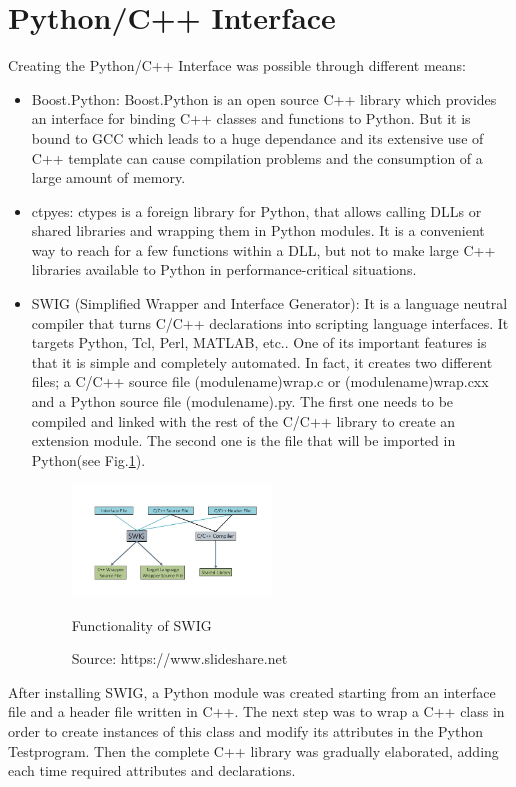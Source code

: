 \section{Python/C++ Interface}
Creating the Python/C++ Interface was possible through different means:\\
\begin{itemize}
\item Boost.Python: Boost.Python is an open source C++ library which provides an interface for binding C++ classes and functions to Python. But it is bound to GCC which leads to a huge dependance and its extensive use of C++ template can cause compilation problems and the consumption of a large amount of memory. \\
\item ctpyes: ctypes is a foreign library for Python, that allows calling DLLs or shared libraries and wrapping them in Python modules. It is a convenient way to reach for a few functions within a DLL, but not to make large C++ libraries available to Python in performance-critical situations.\\
\item SWIG (Simplified Wrapper and Interface Generator): It is a language neutral compiler that turns C/C++ declarations into scripting language interfaces. It targets Python, Tcl, Perl, MATLAB, etc.. One of its important features is that it is simple and completely automated. In fact, it creates two different files; a C/C++ source file (module\textunderscore name)\textunderscore wrap.c or (module\textunderscore name)\textunderscore wrap.cxx and a Python source file (module\textunderscore name).py. The first one needs to be compiled and linked with the rest of the C/C++ library to create an extension module. The second one is the file that will be imported in Python(see Fig.\ref{fig:swig}).\\
\begin{figure}[htb]
  \centering
  \includegraphics[width=0.5\textwidth]{figures/swig_func}
  \caption{Functionality of SWIG}
  \caption*{Source: https://www.slideshare.net}
  \label{fig:swig}
\end{figure}
\end{itemize}
After installing SWIG, a Python module was created starting from an interface file and a header file written in C++. The next step was to wrap a C++ class in order to create instances of this class and modify its attributes in the Python Testprogram. Then the complete C++ library was gradually elaborated, adding each time required attributes and declarations.\\
